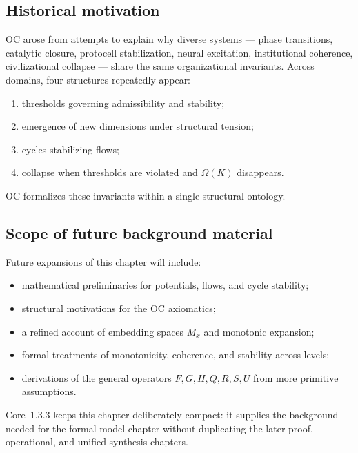 \subsection{Historical motivation}

OC arose from attempts to explain why diverse systems — phase transitions, catalytic closure, protocell stabilization, neural excitation, institutional coherence, civilizational collapse — share the same organizational invariants.
Across domains, four structures repeatedly appear:

\begin{enumerate}
    \item thresholds governing admissibility and stability;
    \item emergence of new dimensions under structural tension;
    \item cycles stabilizing flows;
    \item collapse when thresholds are violated and \(\Omega(K)\) disappears.
\end{enumerate}

OC formalizes these invariants within a single structural ontology.

\subsection{Scope of future background material}

Future expansions of this chapter will include:

\begin{itemize}
    \item mathematical preliminaries for potentials, flows, and cycle stability;
    \item structural motivations for the OC axiomatics;
    \item a refined account of embedding spaces \(M_x\) and monotonic expansion;
    \item formal treatments of monotonicity, coherence, and stability across levels;
    \item derivations of the general operators \(F,G,H,Q,R,S,U\) from more primitive assumptions.
\end{itemize}

Core~1.3.3 keeps this chapter deliberately compact: it supplies the background
needed for the formal model chapter without duplicating the later proof,
operational, and unified-synthesis chapters.
